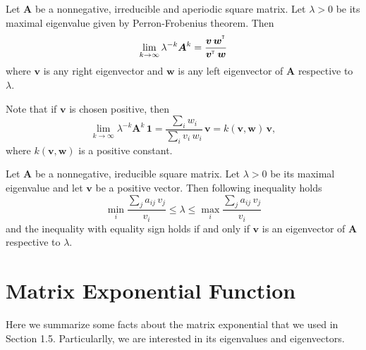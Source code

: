 \begin{appendices}
\begin{thm} 
\label{PFlimit}
Let $\bm{A}$ be a nonnegative, irreducible and aperiodic square matrix. Let $\lambda>0$ be its maximal eigenvalue given by Perron-Frobenius theorem. Then
$$\lim_{k\rightarrow\infty}{\lambda^{-k}}\mbox{\boldmath{$A$}}^k=\frac{\mbox{\boldmath{$v$}}\,\mbox{\boldmath{$w$}}^{^{_\texttt T}}}{\mbox{\boldmath{$v$}}^{^{_\texttt T}}\,\mbox{\boldmath{$w$}}}$$%
where $\bm{v}$ is any right eigenvector and $\bm{w}$ is any left eigenvector of $\bm{A}$ respective to $\lambda$. %
\end{thm}
Note that if $\bm{v}$ is chosen positive, then 
$$\lim_{k\rightarrow\infty}{\lambda^{-k}}\bm{A}^k\,\bm{1}=\frac{\sum_{i} w_i}{\sum_i v_i\, w_i}\,\bm{v}=k(\bm{v},\bm{w})\,\bm{v},$$
where $k(\bm{v},\bm{w})$ is a positive constant.

\begin{thm}
\label{ineq}
Let $\bm{A}$ be a nonnegative, ireducible square matrix. Let $\lambda>0$ be its maximal eigenvalue and let $\bm{v}$ be a positive vector. Then following inequality holds
\begin{equation*}
\min_i \frac{\sum_j a_{ij}\,v_j}{v_i}\leq\lambda\leq\max_i \frac{\sum_j a_{ij}\,v_j}{v_i}
\end{equation*}
and the inequality with equality sign holds if and only if $\bm{v}$ is an eigenvector of $\bm{A}$ respective to $\lambda$.
\end{thm} 

\begin{comment}
\begin{lem}
\label{TtoS}
Let \bm{S}=\exp{\bm{T}}. Let $\kappa_1$ be a maximal egenvalue of $\bm{T}$, that is the one with maximal Eeuclidean norm. Then $e^{\kappa_1}=\lamba_1$ is a maximal eigenvalue of $\bm{S}$. Moreover eigenspace of $\bm{T}$ corresponding to $\mu$ coincides with eigenspace of $\bm{S}$ corresponding to $\lambda$
\end{lem}
\begin{proof}
Note that the 
$$\mu^a=\underset{u\in\mathcal{A}}{\operatorname{argman}}\|{mu|\}$$
\end{proof}
\end{comment}

\chapter{Matrix Exponential Function}

Here we summarize some facts about the matrix exponential that we used in Section 1.5. Particularlly, we are interested in its eigenvalues and eigenvectors.


\end{appendices}
